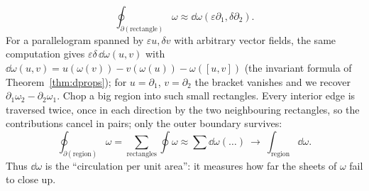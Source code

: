\begin{equation}\label{eq:circ}
\oint_{\partial(\text{rectangle})}\omega\approx\dd\omega(\varepsilon\partial_1,\delta\partial_2).
\end{equation}
For a parallelogram spanned by $\varepsilon u,\delta v$ with arbitrary vector fields, the same computation gives $\varepsilon\delta\,\dd\omega(u,v)$ with $\dd\omega(u,v)=u(\omega(v))-v(\omega(u))-\omega([u,v])$ (the invariant formula of Theorem~\ref{thm:dprops}); for $u=\partial_1$, $v=\partial_2$ the bracket vanishes and we recover $\partial_1\omega_2-\partial_2\omega_1$.
 Chop a big region into such small rectangles. Every interior edge is traversed twice, once in each direction by the two neighbouring rectangles, so the contributions cancel in pairs; only the outer boundary survives:
\[
\oint_{\partial(\text{region})}\omega=\sum_{\text{rectangles}}\oint\omega\approx\sum\dd\omega(\dots)\ \longrightarrow\ \int_{\text{region}}\dd\omega .
\]
Thus $\dd\omega$ is the ``circulation per unit area'': it measures how far the sheets of $\omega$ fail to close up.
